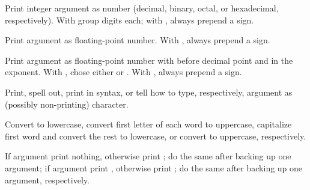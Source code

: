 \begin{LIST}{1cm}
\begin{LIST}{.5cm}
    {
    Print integer argument as number (decimal, binary, octal, or
    hexadecimal, respectively). With \kwd{:} group digits 
     each; with , always prepend a sign.
  }

    {
    Print argument as floating-point number. With , always prepend a sign.
  }

    {
    Print argument as floating-point number with 
    before decimal point and  in the
    exponent. With , chose either  or . With , always prepend a sign.
  }

    {
    Print, spell out, print in \kwd{\#$\backslash$} syntax, or tell how to type, respectively, argument as
    (possibly non-printing) character.
  }

    {\index{\TLD ()}
    Convert to lowercase, convert first letter of each word to
    uppercase, capitalize first word and convert
    the rest to lowercase, or convert to uppercase, respectively.
  }

    {
    If argument   print nothing, otherwise print ;
    do the same after backing up one argument; if argument  
    print , otherwise print ; do the same after
    backing up one argument, respectively. 
  }


\end{LIST}
\end{LIST}
